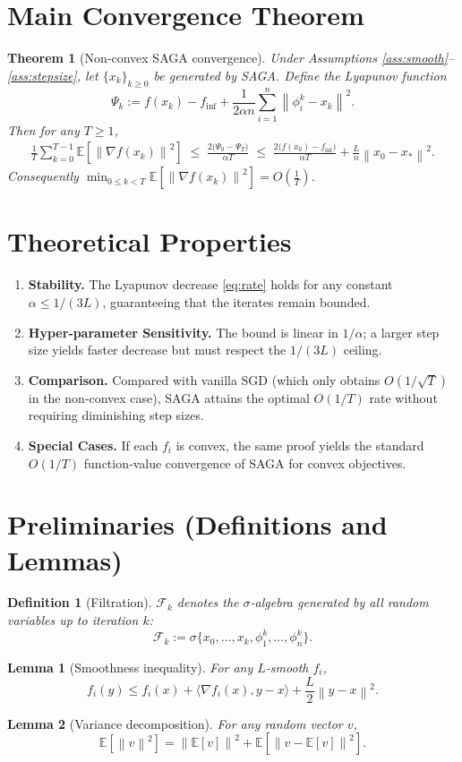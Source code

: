 \documentclass{article}
\newtheorem{theorem}{Theorem}
\newtheorem{lemma}{Lemma}
\newtheorem{definition}{Definition}
\newcommand{\E}{\mathbb{E}}
\newcommand{\norm}[1]{\left\|#1\right\|}
\newcommand{\grad}{\nabla}
\begin{document}
\section*{Main Convergence Theorem}
\begin{theorem}[Non‑convex SAGA convergence]\label{thm:main}
Under Assumptions \ref{ass:smooth}–\ref{ass:stepsize}, let $\{x_k\}_{k\ge0}$ be generated by SAGA. Define the Lyapunov function
\[
\Psi_k:= f(x_k)-f_{\inf} + \frac{1}{2\alpha n}\sum_{i=1}^{n}\norm{\phi_i^k - x_k}^2 .
\]
Then for any $T\ge1$,
\begin{align}
\frac{1}{T}\sum_{k=0}^{T-1}\E\!\left[\norm{\grad f(x_k)}^2\right]
\;\le\;
\frac{2\bigl(\Psi_0-\Psi_T\bigr)}{\alpha T}
\;\le\;
\frac{2\bigl(f(x_0)-f_{\inf}\bigr)}{\alpha T}
    +\frac{L}{n}\norm{x_0-x_*}^2 . \label{eq:rate}
\end{align}
Consequently $\displaystyle\min_{0\le k<T}\E\!\left[\norm{\grad f(x_k)}^2\right]=O\!\left(\frac{1}{T}\right)$.
\end{theorem}

\section*{Theoretical Properties}
\begin{enumerate}[label=\arabic*.]
\item \textbf{Stability.} The Lyapunov decrease \eqref{eq:rate} holds for any constant $\alpha\le1/(3L)$, guaranteeing that the iterates remain bounded.
\item \textbf{Hyper‑parameter Sensitivity.} The bound is linear in $1/\alpha$; a larger step size yields faster decrease but must respect the $1/(3L)$ ceiling.
\item \textbf{Comparison.} Compared with vanilla SGD (which only obtains $O(1/\sqrt{T})$ in the non‑convex case), SAGA attains the optimal $O(1/T)$ rate without requiring diminishing step sizes.
\item \textbf{Special Cases.} If each $f_i$ is convex, the same proof yields the standard $O(1/T)$ function‑value convergence of SAGA for convex objectives.
\end{enumerate}

\section*{Preliminaries (Definitions and Lemmas)}
\begin{definition}[Filtration]
$\mathcal{F}_k$ denotes the $\sigma$‑algebra generated by all random variables up to iteration $k$:
\[
\mathcal{F}_k:=\sigma\bigl\{x_0,\dots,x_k,\phi_1^k,\dots,\phi_n^k\bigr\}.
\]
\end{definition}
\begin{lemma}[Smoothness inequality]\label{lem:smooth}
For any $L$‑smooth $f_i$,
\[
f_i(y)\le f_i(x)+\langle\grad f_i(x),y-x\rangle+\frac{L}{2}\norm{y-x}^2 .
\]
\end{lemma}
\begin{lemma}[Variance decomposition]\label{lem:var}
For any random vector $v$,
\[
\E\!\left[\norm{v}^2\right]=\norm{\E[v]}^2+\E\!\left[\norm{v-\E[v]}^2\right].
\]
\end{lemma}
\end{document}
